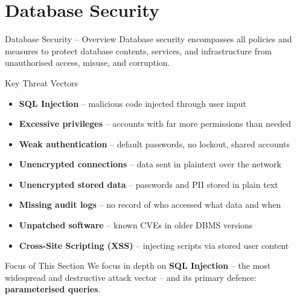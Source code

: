 \section{Database Security}

\begin{frame}{Database Security -- Overview}
  Database security encompasses all policies and measures to protect database contents,
  services, and infrastructure from unauthorised access, misuse, and corruption.

  \begin{block}{Key Threat Vectors}
    \begin{itemize}
      \item \textbf{SQL Injection} -- malicious code injected through user input
      \item \textbf{Excessive privileges} -- accounts with far more permissions than needed
      \item \textbf{Weak authentication} -- default passwords, no lockout, shared accounts
      \item \textbf{Unencrypted connections} -- data sent in plaintext over the network
      \item \textbf{Unencrypted stored data} -- passwords and PII stored in plain text
      \item \textbf{Missing audit logs} -- no record of who accessed what data and when
      \item \textbf{Unpatched software} -- known CVEs in older DBMS versions
      \item \textbf{Cross-Site Scripting (XSS)} -- injecting scripts via stored user content
    \end{itemize}
  \end{block}

  \begin{alertblock}{Focus of This Section}
    We focus in depth on \textbf{SQL Injection} -- the most widespread and destructive
    attack vector -- and its primary defence: \textbf{parameterised queries}.
  \end{alertblock}
\end{frame}

